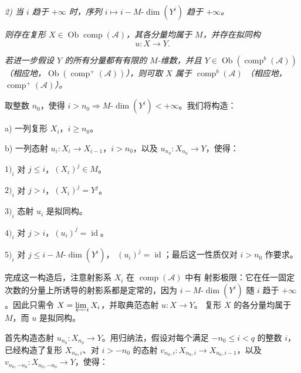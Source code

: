 \clearpage
{}%
\begingroup\small\setlength{\parskip}{0pt}\setlength{\emergencystretch}{1.5em}
\setlength{\abovedisplayskip}{4pt plus 2pt minus 2pt}%
\setlength{\belowdisplayskip}{4pt plus 2pt minus 2pt}%

\noindent\textit{2) 当 $i$ 趋于 $+\infty$ 时，序列
$i\longmapsto i-M\text{-}\dim(Y^i)$ 趋于 $+\infty$。}

\textit{则存在复形
$X\in\operatorname{Ob}\operatorname{comp}(\mathcal A)$，其各分量均属于
$M$，并存在拟同构}
\[
u\colon X\longrightarrow Y.
\]

\textit{若进一步假设 $Y$ 的所有分量都有有限的 $M$-维数，并且
$Y\in\operatorname{Ob}(\operatorname{comp}^{b}(\mathcal A))$
（相应地，$\operatorname{Ob}(\operatorname{comp}^{+}(\mathcal A))$），则可取
$X$ 属于 $\operatorname{comp}^{b}(\mathcal A)$
（相应地，$\operatorname{comp}^{+}(\mathcal A)$）。}

取整数 $n_0$，使得
$i>n_0\Rightarrow M\text{-}\dim(Y^i)<+\infty$。我们将构造：

\noindent a) 一列复形 $X_i$，$i\geq n_0$。

\noindent b) 一列态射
$u_i\colon X_i\longrightarrow X_{i-1}$，$i>n_0$，以及
$u_{n_0}\colon X_{n_0}\longrightarrow Y$，使得：

\noindent $1)_i$ 对 $j\leq i$，$(X_i)^j\in M$。

\noindent $2)_i$ 对 $j>i$，$(X_i)^j=Y^j$。

\noindent $3)_i$ 态射 $u_i$ 是拟同构。

\noindent $4)_i$ 对 $j>i$，$(u_i)^j=\operatorname{id}$。

\noindent $5)_i$ 对 $j\leq i-M\text{-}\dim(Y^i)$，
$(u_i)^j=\operatorname{id}$；最后这一性质仅对 $i>n_0$ 作要求。

完成这一构造后，注意射影系 $X_i$ 在 $\operatorname{comp}(\mathcal A)$ 中有
射影极限：它在任一固定次数的分量上所诱导的射影系都是定常的，因为
$i-M\text{-}\dim(Y^i)$ 随 $i$ 趋于 $+\infty$。因此只需令
$X=\varprojlim_i X_i$，并取典范态射 $u\colon X\longrightarrow Y$。
复形 $X$ 的各分量均属于 $M$，而 $u$ 是拟同构。

首先构造态射 $u_{n_0}\colon X_{n_0}\longrightarrow Y$。用归纳法，假设对每个满足
$-n_0\leq i<q$ 的整数 $i$，已经构造了复形 $X_{n_0,i}$、对
$i>-n_0$ 的态射 $v_{n_0,i}\colon X_{n_0,i}\longrightarrow X_{n_0,i-1}$，以及
$v_{n_0,-n_0}\colon X_{n_0,-n_0}\longrightarrow Y$，使得：

